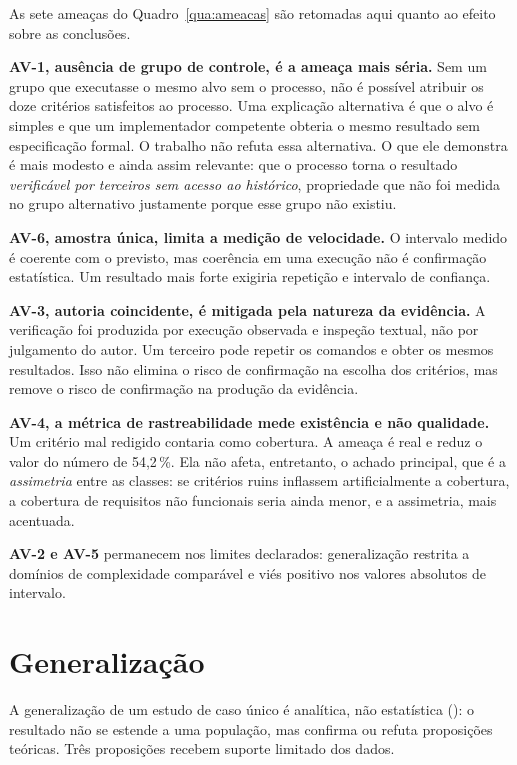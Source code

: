 As sete ameaças do Quadro~\ref{qua:ameacas} são retomadas aqui quanto ao efeito
sobre as conclusões.

\textbf{AV-1, ausência de grupo de controle, é a ameaça mais séria.} Sem um grupo
que executasse o mesmo alvo sem o processo, não é possível atribuir os doze
critérios satisfeitos ao processo. Uma explicação alternativa é que o alvo é
simples e que um implementador competente obteria o mesmo resultado sem
especificação formal. O trabalho não refuta essa alternativa. O que ele
demonstra é mais modesto e ainda assim relevante: que o processo torna o
resultado \emph{verificável por terceiros sem acesso ao histórico}, propriedade
que não foi medida no grupo alternativo justamente porque esse grupo não existiu.

\textbf{AV-6, amostra única, limita a medição de velocidade.} O intervalo medido
é coerente com o previsto, mas coerência em uma execução não é confirmação
estatística. Um resultado mais forte exigiria repetição e intervalo de confiança.

\textbf{AV-3, autoria coincidente, é mitigada pela natureza da evidência.} A
verificação foi produzida por execução observada e inspeção textual, não por
julgamento do autor. Um terceiro pode repetir os comandos e obter os mesmos
resultados. Isso não elimina o risco de confirmação na escolha dos critérios, mas
remove o risco de confirmação na produção da evidência.

\textbf{AV-4, a métrica de rastreabilidade mede existência e não qualidade.} Um
critério mal redigido contaria como cobertura. A ameaça é real e reduz o valor do
número de 54,2\,\%. Ela não afeta, entretanto, o achado principal, que é a
\emph{assimetria} entre as classes: se critérios ruins inflassem artificialmente
a cobertura, a cobertura de requisitos não funcionais seria ainda menor, e a
assimetria, mais acentuada.

\textbf{AV-2 e AV-5} permanecem nos limites declarados: generalização restrita a
domínios de complexidade comparável e viés positivo nos valores absolutos de
intervalo.

\section{Generalização}
\label{sec:disc-generalizacao}

A generalização de um estudo de caso único é analítica, não estatística
(): o resultado não se estende a uma população, mas
confirma ou refuta proposições teóricas. Três proposições recebem suporte
limitado dos dados.

